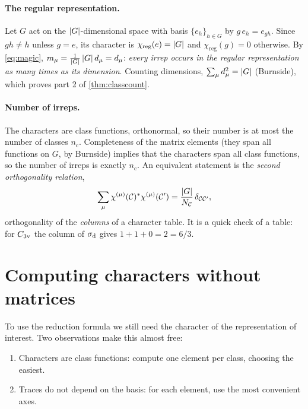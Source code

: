 \paragraph{The regular representation.} Let $G$ act on the $\lvert G\rvert$-dimensional space
with basis $\{e_h\}_{h\in G}$ by $g\,e_h=e_{gh}$. Since $gh\neq h$ unless $g=e$, its
character is $\chi_{\mathrm{reg}}(e)=\lvert G\rvert$ and $\chi_{\mathrm{reg}}(g)=0$ otherwise. By
\eqref{eq:magic}, $m_\mu=\frac{1}{\lvert G\rvert}\,\lvert G\rvert\,d_\mu=d_\mu$: \emph{every irrep occurs
in the regular representation as many times as its dimension}. Counting dimensions,
$\sum_\mu d_\mu^2=\lvert G\rvert$ (Burnside), which proves part 2 of \cref{thm:classcount}.

\paragraph{Number of irreps.} The characters are class functions, orthonormal, so their
number is at most the number of classes $n_{\mathrm{c}}$. Completeness of the matrix
elements (they span all functions on $G$, by Burnside) implies that the characters span
all class functions, so the number of irreps is exactly $n_{\mathrm{c}}$. An equivalent
statement is the \emph{second orthogonality relation},
\begin{equation}
\sum_\mu\chi^{(\mu)}(\mathcal{C})^{*}\chi^{(\mu)}(\mathcal{C}')
=\frac{\lvert G\rvert}{N_{\mathcal{C}}}\,\delta_{\mathcal{C}\mathcal{C}'},
\end{equation}
orthogonality of the \emph{columns} of a character table. It is a quick check of a
table: for $C_{3\mathrm{v}}$ the column of $\sigma_{\mathrm{d}}$ gives $1+1+0=2=6/3$.

\section{Computing characters without matrices}\label{sec:pointops}

To use the reduction formula we still need the character of the representation of
interest. Two observations make this almost free:
\begin{enumerate}
\item Characters are class functions: compute one element per class, choosing the
      easiest.
\item Traces do not depend on the basis: for each element, use the most convenient
      axes.
\end{enumerate}

